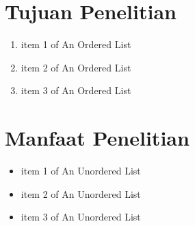 \section{Tujuan Penelitian}
\lipsum[9] %
\begin{enumerate}
    \item item 1 of An Ordered List
    \item item 2 of An Ordered List
    \item item 3 of An Ordered List
\end{enumerate}

\section{Manfaat Penelitian}
\lipsum[10] %
\begin{itemize}
    \item item 1 of An Unordered List
    \item item 2 of An Unordered List
    \item item 3 of An Unordered List
\end{itemize}